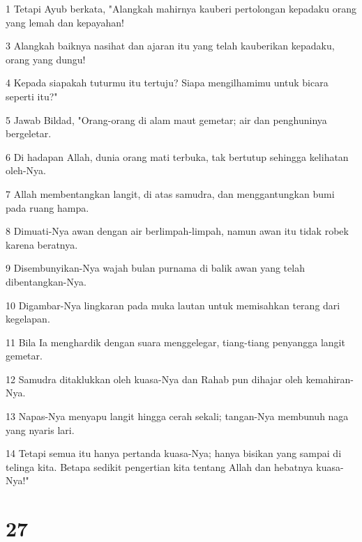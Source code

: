 \par 1 Tetapi Ayub berkata, "Alangkah mahirnya kauberi pertolongan kepadaku orang yang lemah dan kepayahan!
\par 3 Alangkah baiknya nasihat dan ajaran itu yang telah kauberikan kepadaku, orang yang dungu!
\par 4 Kepada siapakah tuturmu itu tertuju? Siapa mengilhamimu untuk bicara seperti itu?"
\par 5 Jawab Bildad, "Orang-orang di alam maut gemetar; air dan penghuninya bergeletar.
\par 6 Di hadapan Allah, dunia orang mati terbuka, tak bertutup sehingga kelihatan oleh-Nya.
\par 7 Allah membentangkan langit, di atas samudra, dan menggantungkan bumi pada ruang hampa.
\par 8 Dimuati-Nya awan dengan air berlimpah-limpah, namun awan itu tidak robek karena beratnya.
\par 9 Disembunyikan-Nya wajah bulan purnama di balik awan yang telah dibentangkan-Nya.
\par 10 Digambar-Nya lingkaran pada muka lautan untuk memisahkan terang dari kegelapan.
\par 11 Bila Ia menghardik dengan suara menggelegar, tiang-tiang penyangga langit gemetar.
\par 12 Samudra ditaklukkan oleh kuasa-Nya dan Rahab pun dihajar oleh kemahiran-Nya.
\par 13 Napas-Nya menyapu langit hingga cerah sekali; tangan-Nya membunuh naga yang nyaris lari.
\par 14 Tetapi semua itu hanya pertanda kuasa-Nya; hanya bisikan yang sampai di telinga kita. Betapa sedikit pengertian kita tentang Allah dan hebatnya kuasa-Nya!"

\chapter{27}

